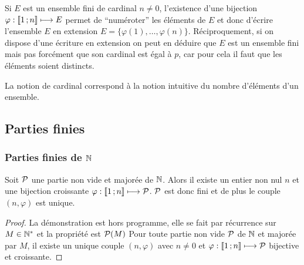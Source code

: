 Si \(E\) est un ensemble fini de cardinal \(n\neq 0\), l'existence d'une bijection \(\varphi:\intervalleentier{1}{n} \longmapsto E\) permet de ``numéroter'' les éléments de \(E\) et donc d'écrire l'ensemble \(E\) en extension \(E=\{\varphi(1), \ldots, \varphi(n)\}\).
Réciproquement, si on dispose d'une écriture en extension on peut en déduire que \(E\) est un ensemble fini mais pas forcément que son cardinal est égal à \(p\), car pour cela il faut que les éléments soient distincts.

La notion de cardinal correspond à la notion intuitive du nombre d'éléments d'un ensemble.

\subsection{Parties finies}

\subsubsection{Parties finies de \(\N\)}

\begin{theo}\label{theo:partfinN}
  Soit \(\P\) une partie non vide et majorée de \(\N\). Alors il existe un entier non nul \(n\) et une bijection croissante \(\varphi:\intervalleentier{1}{n} \longmapsto \P\). \(\P\) est donc fini et de plus le couple \((n,\varphi)\) est unique.
\end{theo}
\begin{proof}
  La démonstration est hors programme, elle se fait par récurrence sur \(M\in\N^*\) et la propriété est \(\P(M)\) Pour toute partie non vide \(\P\) de \(\N\) et majorée par \(M\), il existe un unique couple \((n,\varphi)\) avec \(n\neq 0\) et \(\varphi:\intervalleentier{1}{n} \longmapsto \P\) bijective et croissante. 
\end{proof}

